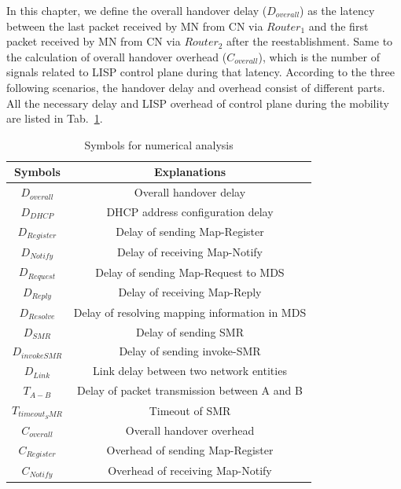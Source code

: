 {In this chapter, we define the overall handover delay ($D_{overall}$) as the latency between the last packet received by MN from CN via $Router_1$ and the first packet received by MN from CN via $Router_2$ after the reestablishment. Same to the calculation of overall handover overhead ($C_{overall}$), which is the number of signals related to LISP control plane during that latency. According to the three following scenarios, the handover delay and overhead consist of different parts. All the necessary delay and LISP overhead of control plane during the mobility are listed in Tab.~\ref{Symbols_numerical_analysis}.
\begin{table}[!tb]
	\centering
	\caption{Symbols for numerical analysis}
	\label{Symbols_numerical_analysis}{
		\begin{tabular}{@{}|c|c|@{}}
			\hline\hline
			Symbols & Explanations   \\ \hline
			$D_{overall}$ & Overall handover delay	\\  \hline    
			$D_{DHCP}$ &  DHCP address configuration delay \\  \hline    
			$D_{Register}$ &  Delay of sending Map-Register      	\\  \hline
			$D_{Notify}$ &  Delay of receiving Map-Notify      	\\  \hline           
			$D_{Request}$ &  Delay of sending Map-Request to MDS      	\\  \hline   
			$D_{Reply}$ &  Delay of receiving Map-Reply      	\\  \hline      
			$D_{Resolve}$ &  Delay of resolving mapping information in MDS      	\\  \hline               
			$D_{SMR}$ &  Delay of sending SMR       	\\  \hline 
			$D_{invokeSMR}$ &  Delay of sending invoke-SMR \\  \hline 
			$D_{Link}$ &  Link delay between two network entities \\  \hline 
			$T_{A-B}$ &  Delay of packet transmission between A and B     	\\  \hline
			$T_{timeout_SMR}$ &  Timeout of SMR      	\\  \hline
			$C_{overall}$ &  Overall handover overhead \\  \hline    
			$C_{Register}$ &  Overhead of sending Map-Register      	\\  \hline
			$C_{Notify}$ &  Overhead of receiving Map-Notify      	\\  \hline           

\end{tabular}}
\end{table}}
